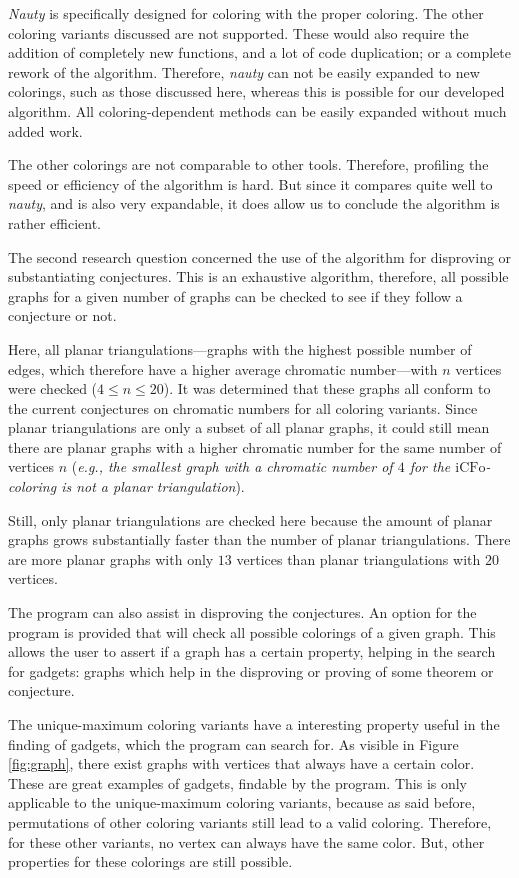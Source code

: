 \documentclass{article}
\begin{document}
\textit{Nauty} is specifically designed for coloring with the proper coloring. The other coloring variants discussed are not supported. These would also require the addition of completely new functions, and a lot of code duplication; or a complete rework of the algorithm. Therefore, \textit{nauty} can not be easily expanded to new colorings, such as those discussed here, whereas this is possible for our developed algorithm. All coloring-dependent methods can be easily expanded without much added work. 

The other colorings are not comparable to other tools. Therefore, profiling the speed or efficiency of the algorithm is hard. But since it compares quite well to \textit{nauty}, and is also very expandable, it does allow us to conclude the algorithm is rather efficient.


The second research question concerned the use of the algorithm for disproving or substantiating conjectures. This is an exhaustive algorithm, therefore, all possible graphs for a given number of graphs can be checked to see if they follow a conjecture or not.

Here, all planar triangulations---graphs with the highest possible number of edges, which therefore have a higher average chromatic number---with $n$ vertices were checked ($4 \le n \le 20$). It was determined that these graphs all conform to the current conjectures on chromatic numbers for all coloring variants. Since planar triangulations are only a subset of all planar graphs, it could still mean there are planar graphs with a higher chromatic number for the same number of vertices $n$ (\textit{e.g., the smallest graph with a chromatic number of $4$ for the $\mathrm{iCFo}$-coloring is not a planar triangulation}). 

Still, only planar triangulations are checked here because the amount of planar graphs grows substantially faster than the number of planar triangulations. There are more planar graphs with only $13$ vertices than planar triangulations with $20$ vertices. 

The program can also assist in disproving the conjectures. An option for the program is provided that will check all possible colorings of a given graph. This allows the user to assert if a graph has a certain property, helping in the search for gadgets: graphs which help in the disproving or proving of some theorem or conjecture. 

The unique-maximum coloring variants have a interesting property useful in the finding of gadgets, which the program can search for. As visible in Figure \ref{fig:graph}, there exist graphs with vertices that always have a certain color. These are great examples of gadgets, findable by the program. This is only applicable to the unique-maximum coloring variants, because as said before, permutations of other coloring variants still lead to a valid coloring. Therefore, for these other variants, no vertex can always have the same color. But, other properties for these colorings are still possible.
\end{document}
